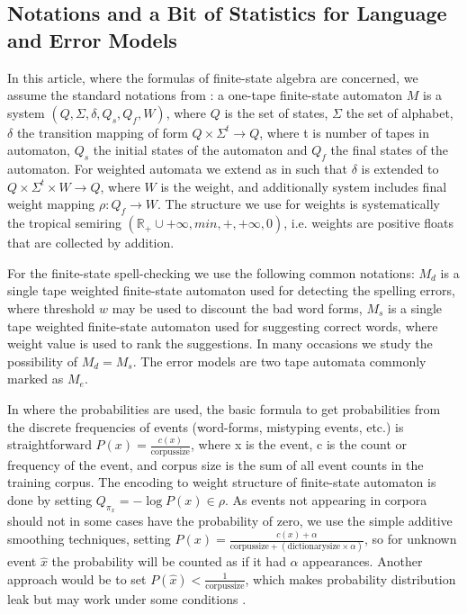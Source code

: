 \documentclass[a4paper,12pt]{article}
\begin{document}
\subsection{Notations and a Bit of Statistics for Language and Error Models}
\label{subsec:theory}

In this article, where the formulas of finite-state algebra are concerned, we
assume the standard notations from \cite{aho2007compilers}: a one-tape
finite-state automaton $M$ is a system $(Q, \Sigma, \delta, Q_s, Q_f, W)$,
where $Q$ is the set of states, $\Sigma$ the set of alphabet, $\delta$ the
transition mapping of form $Q \times \Sigma^t \rightarrow Q$, where t is number
of tapes in automaton, $Q_s$ the initial states of the automaton and $Q_f$ the
final states of the automaton. For weighted automata we extend as in
\cite{mohri2009weighted} such that $\delta$ is extended to $Q \times \Sigma^t
\times W \rightarrow Q$, where $W$ is the weight, and additionally system
includes final weight mapping $\rho: Q_f \rightarrow W$. The structure we
use for weights is systematically the tropical semiring 
$(\mathbb{R}_+ \cup {+\infty}, min, +, +\infty, 0)$, i.e. weights are positive
floats that are collected by addition.

For the finite-state spell-checking we use the following common notations:
$M_d$ is a single tape weighted finite-state automaton used for detecting the
spelling errors, where threshold $w$ may be used to discount the bad word
forms, $M_s$ is a single tape weighted finite-state automaton used for
suggesting correct words, where weight value is used to rank the suggestions.
In many occasions we study the possibility of $M_d = M_s$. The error models are
two tape automata commonly marked as $M_e$.

In where the probabilities are used, the basic formula to get probabilities
from the discrete frequencies of events (word-forms, mistyping events, etc.) is
straightforward $P(x) = \frac{c(x)}{\mathrm{corpus size}}$, where x is the
event, c is the count or frequency of the event, and corpus size is the sum of
all event counts in the training corpus. The encoding to weight structure of
finite-state automaton is done by setting $Q_{\pi_x} = -\log P(x) \in \rho$.
As events not appearing in corpora should not in some cases have the
probability of zero, we use the simple additive smoothing techniques, setting
$P(x) = \frac{c(x) + \alpha}{\mathrm{corpus size} + (\mathrm{dictionary size}
\times \alpha)}$, so for unknown event $\hat{x}$ the probability will be
counted as if it had $\alpha$ appearances.  Another approach would be to set
$P(\hat{x}) < \frac{1}{\mathrm{corpus size}}$, which makes probability
distribution leak but may work under some conditions \cite[]{brants2007large}.
\end{document}
